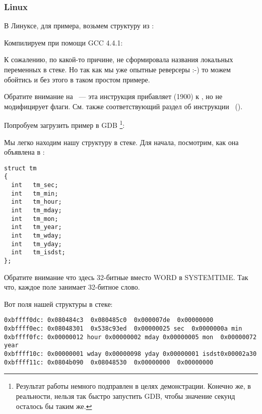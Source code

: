 ﻿\subsubsection{Linux}

В Линуксе, для примера, возьмем структуру  из :



Компилируем при помощи GCC 4.4.1:



К сожалению, по какой-то причине, \IDA не сформировала названия локальных переменных в стеке. 
Но так как мы уже опытные реверсеры :-) то можем обойтись и без этого в таком простом примере.

Обратите внимание на  ~--- эта инструкция прибавляет  (1900) к \EAX, 
но не модифицирует флаги. См. также соответствующий раздел об инструкции \LEA{}~().



Попробуем загрузить пример в GDB
\footnote{Результат работы  немного подправлен в целях демонстрации.
Конечно же, в реальности, нельзя так быстро запустить GDB, чтобы значение секунд осталось бы таким же.}:



Мы легко находим нашу структуру в стеке.
Для начала, посмотрим, как она объявлена в :

\begin{lstlisting}[caption=time.h, label=struct_tm]
struct tm
{
  int	tm_sec;
  int	tm_min;
  int	tm_hour;
  int	tm_mday;
  int	tm_mon;
  int	tm_year;
  int	tm_wday;
  int	tm_yday;
  int	tm_isdst;
};
\end{lstlisting}

Обратите внимание что здесь 32-битные \Tint вместо WORD в SYSTEMTIME.
Так что, каждое поле занимает 32-битное слово.

Вот поля нашей структуры в стеке:

\begin{lstlisting}
0xbffff0dc:	0x080484c3	0x080485c0	0x000007de	0x00000000
0xbffff0ec:	0x08048301	0x538c93ed	0x00000025 sec	0x0000000a min
0xbffff0fc:	0x00000012 hour	0x00000002 mday	0x00000005 mon 	0x00000072 year
0xbffff10c:	0x00000001 wday	0x00000098 yday	0x00000001 isdst0x00002a30
0xbffff11c:	0x0804b090	0x08048530	0x00000000	0x00000000
\end{lstlisting}

